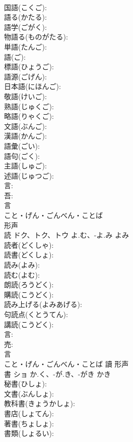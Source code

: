 \documentclass[8pt]{extreport}
\begin{document}
\begin{CJK}{UTF8}{min}
\\	国語(こくご): 
\\	語る(かたる): 
\\	語学(ごがく): 
\\	物語る(ものがたる): 
\\	単語(たんご): 
\\	語(ご): 
\\	標語(ひょうご): 
\\	語源(ごげん): 
\\	日本語(にほんご): 
\\	敬語(けいご): 
\\	熟語(じゅくご): 
\\	略語(りゃくご): 
\\	文語(ぶんご): 
\\	漢語(かんご): 
\\	語彙(ごい): 
\\	語句(ごく): 
\\	主語(しゅご): 
\\	述語(じゅつご): 
\\	言: 
\\	吾: 
\\	言	
\\	こと・げん・ごんべん・ことば	
\\	形声 
\\	読	ドク、トク、トウ	よ.む、-よ.み	よみ	
\\	読者(どくしゃ): 
\\	読書(どくしょ): 
\\	読み(よみ): 
\\	読む(よむ): 
\\	朗読(ろうどく): 
\\	購読(こうどく): 
\\	読み上げる(よみあげる): 
\\	句読点(くとうてん): 
\\	講読(こうどく): 
\\	言: 
\\	売: 
\\	言	
\\	こと・げん・ごんべん・ことば	讀	形声 
\\	書	ショ	か.く、-が.き、-がき	かき	
\\	秘書(ひしょ): 
\\	文書(ぶんしょ): 
\\	教科書(きょうかしょ): 
\\	書店(しょてん): 
\\	著書(ちょしょ): 
\\	書類(しょるい): 

\end{CJK}
\end{document}
